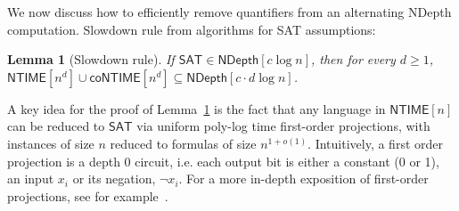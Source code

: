 \documentclass[a4paper, 11pt]{article}
\theoremstyle{plain}
\newtheorem{lemma}[theorem]{Lemma}
\theoremstyle{definition}
\theoremstyle{remark}
\newcommand{\NTIME}{\textsf{NTIME}}%
\newcommand{\coNTIME}{\textsf{coNTIME}}%
\newcommand{\SAT}{\textsf{SAT}}%
\newcommand{\ND}{\textsf{NDepth}}%
\newcommand{\NDL}[1]{\ND[ #1 \log n]}%
\begin{document}
We now discuss how to efficiently remove quantifiers from an alternating \ND{} computation.
Slowdown rule from algorithms for SAT assumptions:
\begin{lemma}[Slowdown rule]\label{lemma:slowdown}
	If $\SAT{}\in \NDL{c}$, then for every $d \ge 1$, $\NTIME[n^d] \cup \coNTIME[n^d] \subseteq \NDL{c\cdot d}$.
\end{lemma}

A key idea for the proof of Lemma~\ref{lemma:slowdown} 
is the fact that any language in $\NTIME[n]$ can
be reduced to $\SAT{}$ via uniform poly-log time first-order projections, 
with instances of size $n$ reduced to formulas of size $n^{1+o(1)}$.
Intuitively, a first order projection is a depth 0 circuit, 
i.e. each output bit is either a constant (0 or 1),
an input $x_i$ or its negation, $\neg x_i$.
For a more in-depth exposition of first-order projections,
see for example~\cite[End of Sec.~3]{allender1997first}.
\end{document}
